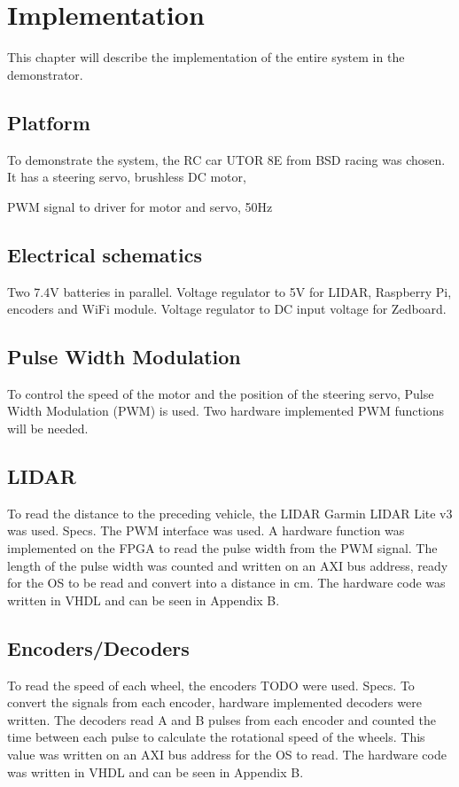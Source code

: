 \chapter{Implementation}
This chapter will describe the implementation of the entire system in the demonstrator.

\section{Platform}
To demonstrate the system, the RC car UTOR 8E from BSD racing was chosen. It has a steering servo, brushless DC motor, 

PWM signal to driver for motor and servo, 50Hz

\section{Electrical schematics}
Two 7.4V batteries in parallel. Voltage regulator to 5V for LIDAR, Raspberry Pi, encoders and WiFi module. Voltage regulator to DC input voltage for Zedboard.

\section{Pulse Width Modulation}
To control the speed of the motor and the position of the steering servo, Pulse Width Modulation (PWM) is used. Two hardware implemented PWM functions will be needed.

\section{LIDAR}
To read the distance to the preceding vehicle, the LIDAR Garmin LIDAR Lite v3 was used. Specs. The PWM interface was used. A hardware function was implemented on the FPGA to read the pulse width from the PWM signal. The length of the pulse width was counted and written on an AXI bus address, ready for the OS to be read and convert into a distance in cm. The hardware code was written in VHDL and can be seen in Appendix B.

\section{Encoders/Decoders}
To read the speed of each wheel, the encoders TODO were used. Specs. To convert the signals from each encoder, hardware implemented decoders were written. The decoders read A and B pulses from each encoder and counted the time between each pulse to calculate the rotational speed of the wheels. This value was written on an AXI bus address for the OS to read. The hardware code was written in VHDL and can be seen in Appendix B.

